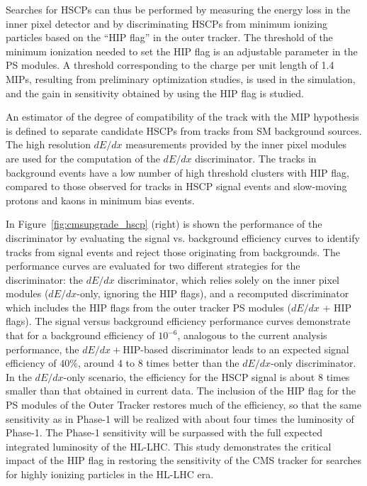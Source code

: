 Searches for HSCPs can thus be performed by measuring the energy loss in the inner pixel detector and by discriminating HSCPs from minimum ionizing particles based on the ``HIP flag'' in the outer tracker. The threshold of the minimum ionization needed to set the HIP flag is an adjustable parameter in the PS modules. A threshold corresponding to the charge per unit length of 1.4 MIPs, resulting from preliminary optimization studies, is used in the simulation, and the gain in sensitivity obtained by using the HIP flag is studied.

An estimator of the degree of compatibility of the track with the MIP hypothesis is defined to separate candidate HSCPs from tracks from SM background sources. The high resolution $dE/dx$ measurements provided by the inner pixel modules are used for the computation of the $dE/dx$ discriminator. The tracks in background events have a low number of high threshold clusters with HIP flag, compared to those observed for tracks in HSCP signal events and slow-moving protons and kaons in minimum bias events.

In Figure~\ref{fig:cmsupgrade_hscp} (right) is shown the performance of the discriminator by evaluating the signal vs. background efficiency curves to identify tracks from signal events and reject those originating from backgrounds. The performance curves are evaluated for two different strategies for the discriminator: the $dE/dx$ discriminator, which relies solely on the inner pixel modules ($dE/dx$-only, ignoring the HIP flags), and a recomputed discriminator which includes the HIP flags from the outer tracker PS modules ($dE/dx$ + HIP flags). The signal versus background efficiency performance curves demonstrate that for a background efficiency of $10^{-6}$, analogous to the current analysis performance, the $dE/dx+$HIP-based discriminator leads to an expected signal efficiency of $40\%$, around 4 to 8 times better than the $dE/dx$-only discriminator. In the $dE/dx$-only scenario, the efficiency for the HSCP signal is about 8 times smaller than that obtained in current data. The inclusion of the HIP flag for the PS modules of the Outer Tracker restores much of the efficiency, so that the same sensitivity as in Phase-1 will be realized with about four times the luminosity of Phase-1. The Phase-1 sensitivity will be surpassed with the full expected integrated luminosity of the HL-LHC. This study demonstrates the critical impact of the HIP flag in restoring the sensitivity of the CMS tracker for searches for highly ionizing particles in the HL-LHC era.


